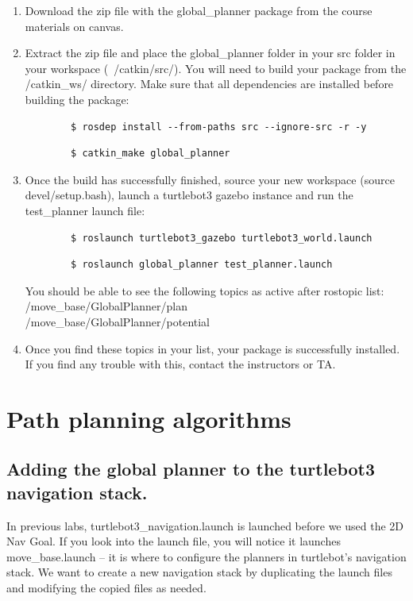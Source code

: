 \documentclass[12pt]{article}
\begin{document}
\begin{enumerate}
    \item Download the zip file with the global\_planner package from the course materials on canvas.
    \item Extract the zip file and place the global\_planner folder in your src folder in your workspace (~/catkin/src/). You will need to build your package from the /catkin\_ws/ directory. Make sure that all dependencies are installed before building the package:
    \begin{verbatim}
        $ rosdep install --from-paths src --ignore-src -r -y
    \end{verbatim}
    
    \begin{verbatim}
        $ catkin_make global_planner
    \end{verbatim}
    
    \item Once the build has successfully finished, source your new workspace (source devel/setup.bash), launch a turtlebot3 gazebo instance and run the test\_planner launch file:
    
    \begin{verbatim}
        $ roslaunch turtlebot3_gazebo turtlebot3_world.launch
    \end{verbatim}
    
    \begin{verbatim}
        $ roslaunch global_planner test_planner.launch
    \end{verbatim}
    
     You should be able to see the following topics as active after rostopic list:\\
        /move\_base/GlobalPlanner/plan\\
        /move\_base/GlobalPlanner/potential
    \item Once you find these topics in your list, your package is successfully installed. If you find any trouble with this, contact the instructors or TA.
\end{enumerate}

\section{Path planning algorithms}

\subsection{Adding the global planner to the turtlebot3 navigation stack.}
In previous labs, turtlebot3\_navigation.launch is launched before we used the 2D Nav Goal. If you look into the launch file, you will notice it launches move\_base.launch -- it is where to configure the planners in turtlebot's navigation stack. We want to create a new navigation stack by duplicating the launch files and modifying the copied files as needed.
\end{document}
